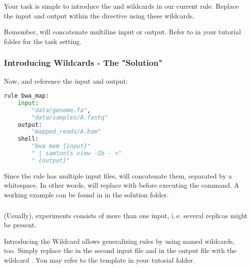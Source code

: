 \begin{frame}[fragile]
	\frametitle{}
	\begin{task}
	   Your task is simple to introduce the  and   wildcards in our current  rule. Replace the input and output within the  directive using these wildcards.
	\end{task}
    \begin{hint}
       Remember, \Snakemake{} will concatenate multiline input or output. Refer to   in your tutorial folder for the task setting.
    \end{hint}
\end{frame}

\begin{frame}[fragile]
  \frametitle{Introducing Wildcards - The "Solution"}
  Now,  and  reference the input and output:
  \begin{lstlisting}[language=Python,style=Python]
rule bwa_map:
    input:
        "data/genome.fa",
        "data/samples/A.fastq"
    output:
        "mapped_reads/A.bam"
    shell:
        "bwa mem {input}"
        " | samtools view -Sb - >"
        " {output}"
    \end{lstlisting}
    Since the rule has multiple input files, \Snakemake{} will concatenate them, separated by a whitespace. In other words, \Snakemake{} will replace  with  before executing the command.\newline
    A working example can be found in  in the solution folder.
\end{frame}

\begin{frame}[fragile]
  \frametitle{}
  (Usually), experiments consists of more than one input, i.\,e. several replicas might be present.\newline
  \begin{task}{Introducing the  Wildcard}
    \Snakemake{} allows generalizing rules by using named wildcards, too. Simply replace the  in the second input file and in the output file with the wildcard .\newline
    You may refer to the  template in your tutorial folder.
  \end{task}
\end{frame}

